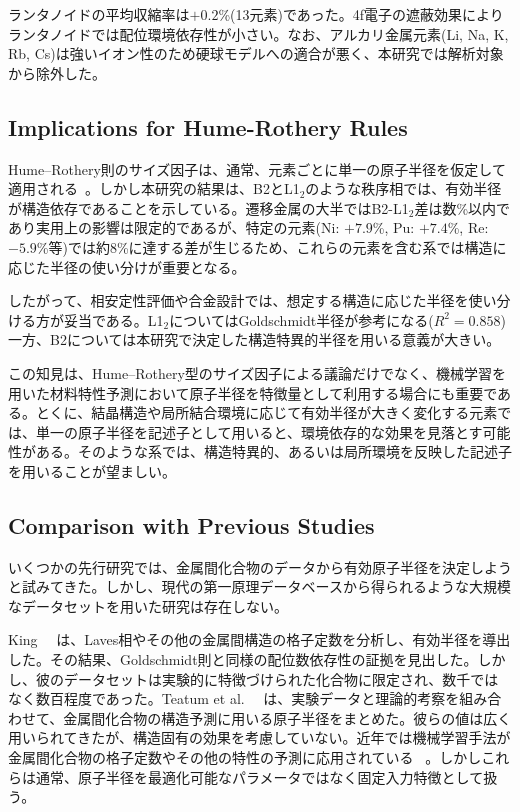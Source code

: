 \documentclass[a4paper,10pt,5p]{elsarticle}
\begin{document}
ランタノイドの平均収縮率は$+0.2$\%(13元素)であった。4f電子の遮蔽効果によりランタノイドでは配位環境依存性が小さい。なお、アルカリ金属元素(Li, Na, K, Rb, Cs)は強いイオン性のため硬球モデルへの適合が悪く、本研究では解析対象から除外した。


\subsection{Implications for Hume-Rothery Rules}
Hume--Rothery則のサイズ因子は、通常、元素ごとに単一の原子半径を仮定して適用される~\citep{humerothery1936, miracle2017}。しかし本研究の結果は、B2とL1$_2$のような秩序相では、有効半径が構造依存であることを示している。遷移金属の大半ではB2-L1$_2$差は数\%以内であり実用上の影響は限定的であるが、特定の元素(Ni: $+7.9$\%, Pu: $+7.4$\%, Re: $-5.9$\%等)では約8\%に達する差が生じるため、これらの元素を含む系では構造に応じた半径の使い分けが重要となる。

したがって、相安定性評価や合金設計では、想定する構造に応じた半径を使い分ける方が妥当である。L1$_2$についてはGoldschmidt半径が参考になる($R^2 = 0.858$)一方、B2については本研究で決定した構造特異的半径を用いる意義が大きい。

この知見は、Hume--Rothery型のサイズ因子による議論だけでなく、機械学習を用いた材料特性予測において原子半径を特徴量として利用する場合にも重要である。とくに、結晶構造や局所結合環境に応じて有効半径が大きく変化する元素では、単一の原子半径を記述子として用いると、環境依存的な効果を見落とす可能性がある。そのような系では、構造特異的、あるいは局所環境を反映した記述子を用いることが望ましい。


\subsection{Comparison with Previous Studies}

いくつかの先行研究では、金属間化合物のデータから有効原子半径を決定しようと試みてきた。しかし、現代の第一原理データベースから得られるような大規模なデータセットを用いた研究は存在しない。

King~~\citep{king1966} は、Laves相やその他の金属間構造の格子定数を分析し、有効半径を導出した。その結果、Goldschmidt則と同様の配位数依存性の証拠を見出した。しかし、彼のデータセットは実験的に特徴づけられた化合物に限定され、数千ではなく数百程度であった。Teatum et al.~~\citep{teatum1960} は、実験データと理論的考察を組み合わせて、金属間化合物の構造予測に用いる原子半径をまとめた。彼らの値は広く用いられてきたが、構造固有の効果を考慮していない。近年では機械学習手法が金属間化合物の格子定数やその他の特性の予測に応用されている ~\citep{ward2016}。しかしこれらは通常、原子半径を最適化可能なパラメータではなく固定入力特徴として扱う。
\end{document}
